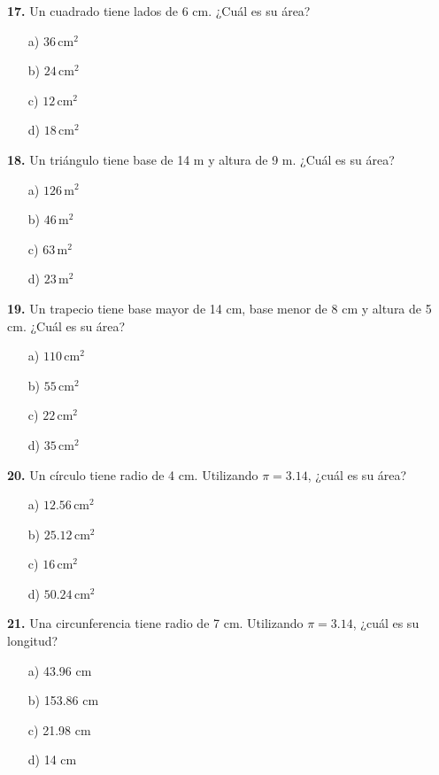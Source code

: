 \noindent\textbf{17.} Un cuadrado tiene lados de 6 cm. ¿Cuál es su área?

\begin{itemize}
    \item[a)] $36\,\text{cm}^2$
    \item[b)] $24\,\text{cm}^2$
    \item[c)] $12\,\text{cm}^2$
    \item[d)] $18\,\text{cm}^2$
\end{itemize}


\noindent\textbf{18.} Un triángulo tiene base de 14 m y altura de 9 m. ¿Cuál es su área?

\begin{itemize}
    \item[a)] $126\,\text{m}^2$
    \item[b)] $46\,\text{m}^2$
    \item[c)] $63\,\text{m}^2$
    \item[d)] $23\,\text{m}^2$
\end{itemize}


\noindent\textbf{19.} Un trapecio tiene base mayor de 14 cm, base menor de 8 cm y altura de 5 cm. ¿Cuál es su área?

\begin{itemize}
    \item[a)] $110\,\text{cm}^2$
    \item[b)] $55\,\text{cm}^2$
    \item[c)] $22\,\text{cm}^2$
    \item[d)] $35\,\text{cm}^2$
\end{itemize}


\noindent\textbf{20.} Un círculo tiene radio de 4 cm. Utilizando $\pi=3.14$, ¿cuál es su área?

\begin{itemize}
    \item[a)] $12.56\,\text{cm}^2$
    \item[b)] $25.12\,\text{cm}^2$
    \item[c)] $16\,\text{cm}^2$
    \item[d)] $50.24\,\text{cm}^2$
\end{itemize}


\noindent\textbf{21.} Una circunferencia tiene radio de 7 cm. Utilizando $\pi=3.14$, ¿cuál es su longitud?

\begin{itemize}
    \item[a)] 43.96 cm
    \item[b)] 153.86 cm
    \item[c)] 21.98 cm
    \item[d)] 14 cm
\end{itemize}


